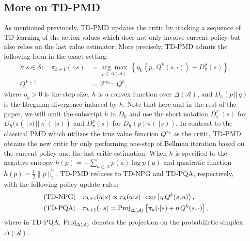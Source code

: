 \documentclass[10pt]{article}
\newcommand{\Proj}{\textup{Proj}}
\newcommand{\calA}{\mathcal{A}}
\newcommand{\calS}{\mathcal{S}}
\newcommand{\ls}{\left}
\newcommand{\rs}{\right}
\theoremstyle{plain}
\theoremstyle{definition}
\begin{document}
\subsection{More on TD-PMD}
As mentioned previously, TD-PMD updates the critic by tracking a sequence of TD learning of the action values which does not only involve current policy but also relies on the last value estimator. More precisely, TD-PMD admits the following form in the exact setting: 
\begin{equation}\label{eq:AC-PMD-policy-update}
\begin{aligned}
    \forall\, s\in\calS: \quad \pi_{k+1}(\cdot|s) &= \underset{p\in\Delta(\calA)}{\arg\max} \, \ls\{ \eta_k \ls\langle p, \, Q^k(s,\cdot) \rs\rangle - D^p_\pi(s) \rs\},\\
    Q^{k+1} &=\mathcal{F}^{\pi_{k+1}}Q^k,
\end{aligned}
\end{equation}
where $\eta_k > 0$ is the step size, $h$ is a convex function over $\Delta(\calA)$, and $D_h(p \, ||\, q)$ is the Bregman divergence induced by $h$. Note that here  and in the rest of the paper, we will omit the subscript $h$ in $D_h$ and use the short notation $D^\pi_{\pi^\prime}(s)$ for $D_h(\pi(\cdot|s) \, ||\, \pi^\prime(\cdot|s))$ and $D^p_{\pi}(s)$ for $D_h(p \, || \, \pi(\cdot|s))$. In contrast to the classical PMD which utilizes the true value function $Q^{\pi_k}$ as the critic, TD-PMD obtains the new critic by only performing one-step of Bellman iteration based on the current policy and the last critic estimation. When $h$ is specified to  the negative entropy $h(p) = -\sum_{a\in\calA} p(a)\log p(a)$ and quadratic function $h(p) = \frac{1}{2}\| p \|_2^2$, TD-PMD reduces to TD-NPG and TD-PQA, respectively, with the following policy update rules: 
\begin{align*}
    \mbox{(TD-NPG)} \quad&\pi_{k+1}(a|s) \propto \pi_k(a|s) \cdot \exp \ls( \eta \, Q^k(s,a) \rs), \\
    \mbox{(TD-PQA)} \quad& \pi_{k+1}(\cdot | s) = \Proj_{\Delta(\calA)} \ls[ \pi_k(\cdot|s) + \eta \, Q^k(s,\cdot) \rs],
\end{align*}
where in TD-PQA, $\Proj_{\Delta(\calA)}$ denotes the projection on the probabilistic simplex $\Delta(\calA)$.
\end{document}
